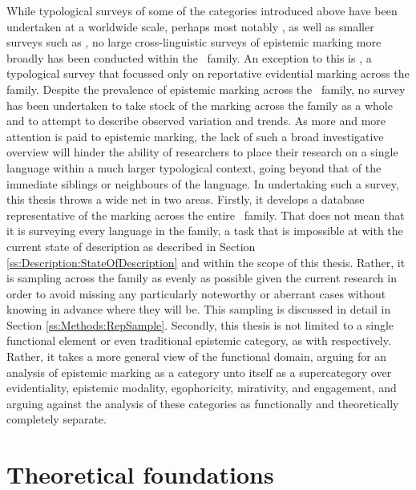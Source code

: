 While typological surveys of some of the categories introduced above have been undertaken at a worldwide scale, perhaps most notably , as well as smaller surveys such as , no large cross-linguistic surveys of epistemic marking more broadly has been conducted within the \lfam\ family. An exception to this is , a typological survey that focussed only on reportative evidential marking across the family. Despite the prevalence of epistemic marking across the \lfam\ family, no survey has been undertaken to take stock of the marking across the family as a whole and to attempt to describe observed variation and trends. As more and more attention is paid to epistemic marking, the lack of such a broad investigative overview will hinder the ability of researchers to place their research on a single language within a much larger typological context, going beyond that of the immediate siblings or neighbours of the language. In undertaking such a survey, this thesis throws a wide net in two areas. Firstly, it develops a database representative of the marking across the entire \lfam\ family. That does not mean that it is surveying every language in the family, a task that is impossible at with the current state of description as described in Section \ref{ss:Description:StateOfDescription} and within the scope of this thesis. Rather, it is sampling across the family as evenly as possible given the current research in order to avoid missing any particularly noteworthy or aberrant cases without knowing in advance where they will be. This sampling is discussed in detail in Section \ref{ss:Methods:RepSample}. Secondly, this thesis is not limited to a single functional element or even traditional epistemic category, as with  respectively. Rather, it takes a more general view of the functional domain, arguing for an analysis of epistemic marking as a category unto itself as a supercategory over evidentiality, epistemic modality, egophoricity, mirativity, and engagement, and arguing against the analysis of these categories as functionally and theoretically completely separate.



\chapter{Theoretical foundations}\label{c:Foundations}
